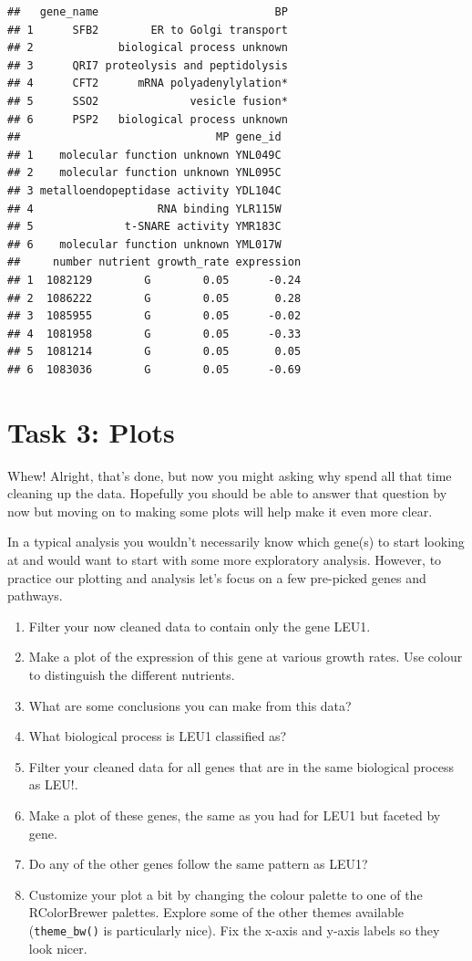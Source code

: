 \documentclass[]{book}
\providecommand{\tightlist}{%
  \setlength{\itemsep}{0pt}\setlength{\parskip}{0pt}}
\begin{document}
\begin{verbatim}
##   gene_name                           BP
## 1      SFB2        ER to Golgi transport
## 2             biological process unknown
## 3      QRI7 proteolysis and peptidolysis
## 4      CFT2      mRNA polyadenylylation*
## 5      SSO2              vesicle fusion*
## 6      PSP2   biological process unknown
##                              MP gene_id
## 1    molecular function unknown YNL049C
## 2    molecular function unknown YNL095C
## 3 metalloendopeptidase activity YDL104C
## 4                   RNA binding YLR115W
## 5              t-SNARE activity YMR183C
## 6    molecular function unknown YML017W
##     number nutrient growth_rate expression
## 1  1082129        G        0.05      -0.24
## 2  1086222        G        0.05       0.28
## 3  1085955        G        0.05      -0.02
## 4  1081958        G        0.05      -0.33
## 5  1081214        G        0.05       0.05
## 6  1083036        G        0.05      -0.69
\end{verbatim}

\hypertarget{task-3-plots}{%
\section*{Task 3: Plots}\label{task-3-plots}}

Whew! Alright, that's done, but now you might asking why spend all that time cleaning up the data. Hopefully you should be able to answer that question by now but moving on to making some plots will help make it even more clear.

In a typical analysis you wouldn't necessarily know which gene(s) to start looking at and would want to start with some more exploratory analysis. However, to practice our plotting and analysis let's focus on a few pre-picked genes and pathways.

\begin{enumerate}
\def\labelenumi{\arabic{enumi}.}
\tightlist
\item
  Filter your now cleaned data to contain only the gene LEU1.
\item
  Make a plot of the expression of this gene at various growth rates. Use colour to distinguish the different nutrients.
\item
  What are some conclusions you can make from this data?
\item
  What biological process is LEU1 classified as?
\item
  Filter your cleaned data for all genes that are in the same biological process as LEU!.
\item
  Make a plot of these genes, the same as you had for LEU1 but faceted by gene.
\item
  Do any of the other genes follow the same pattern as LEU1?\\
\item
  Customize your plot a bit by changing the colour palette to one of the RColorBrewer palettes. Explore some of the other themes available (\texttt{theme\_bw()} is particularly nice). Fix the x-axis and y-axis labels so they look nicer.
\end{enumerate}
\end{document}
